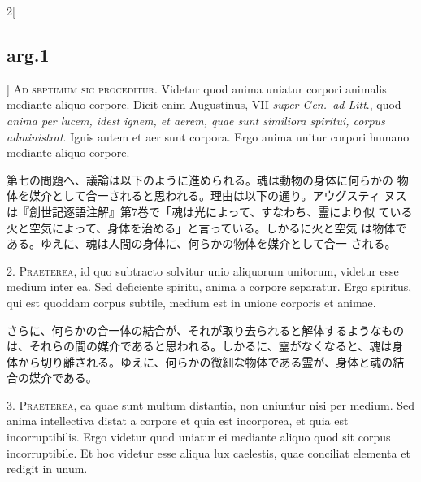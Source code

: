 \documentclass[paper=a4paper,fontsize=10pt,jafontsize=9pt,titlepage]{jlreq}
\begin{document}
\begin{paracol}{2}[\subsection{arg.1}]
{\scshape Ad septimum sic proceditur}. Videtur quod anima uniatur
corpori animalis mediante aliquo corpore. Dicit enim Augustinus, VII
{\itshape super Gen.~ad Litt}., quod {\itshape anima per lucem, idest
ignem, et aerem, quae sunt similiora spiritui, corpus
administrat}. Ignis autem et aer sunt corpora. Ergo anima unitur
corpori humano mediante aliquo corpore.

\switchcolumn

 第七の問題へ、議論は以下のように進められる。魂は動物の身体に何らかの
 物体を媒介として合一されると思われる。理由は以下の通り。アウグスティ
 ヌスは『創世記逐語注解』第7巻で「魂は光によって、すなわち、霊により似
 ている火と空気によって、身体を治める」と言っている。しかるに火と空気
 は物体である。ゆえに、魂は人間の身体に、何らかの物体を媒介として合一
 される。





2. {\scshape Praeterea}, id quo subtracto solvitur unio aliquorum
unitorum, videtur esse medium inter ea. Sed deficiente spiritu, anima
a corpore separatur. Ergo spiritus, qui est quoddam corpus subtile,
medium est in unione corporis et animae.

\switchcolumn

さらに、何らかの合一体の結合が、それが取り去られると解体するようなもの
は、それらの間の媒介であると思われる。しかるに、霊がなくなると、魂は身
体から切り離される。ゆえに、何らかの微細な物体である霊が、身体と魂の結
合の媒介である。




3. {\scshape Praeterea}, ea quae sunt multum distantia, non uniuntur
nisi per medium. Sed anima intellectiva distat a corpore et quia est
incorporea, et quia est incorruptibilis. Ergo videtur quod uniatur ei
mediante aliquo quod sit corpus incorruptibile. Et hoc videtur esse
aliqua lux caelestis, quae conciliat elementa et redigit in unum.


\end{paracol}
\end{document}
